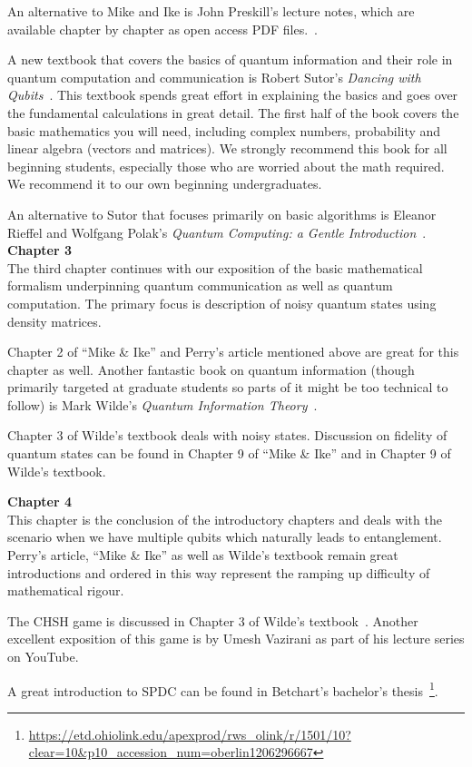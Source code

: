An alternative to Mike and Ike is John Preskill's lecture notes, which are available chapter by chapter as open access PDF files.~\cite{preskill1998lecture}.

A new textbook that covers the basics of quantum information and their role in quantum computation and communication is Robert Sutor's \emph{Dancing with Qubits}~\cite{sutor19:dancing}. This textbook spends great effort in explaining the basics and goes over the fundamental calculations in great detail. The first half of the book covers the basic mathematics you will need, including complex numbers, probability and linear algebra (vectors and matrices). We strongly recommend this book for all beginning students, especially those who are worried about the math required. We recommend it to our own beginning undergraduates.

An alternative to Sutor that focuses primarily on basic algorithms is Eleanor Rieffel and Wolfgang Polak's \emph{Quantum Computing: a Gentle Introduction}~\cite{rieffel2011quantum}.\\

\textbf{Chapter 3}\\

The third chapter continues with our exposition of the basic mathematical formalism underpinning quantum communication as well as quantum computation. The primary focus is description of noisy quantum states using density matrices.

Chapter 2 of “Mike \& Ike” and Perry’s article mentioned above are great for this chapter as well. Another fantastic book on quantum information (though primarily targeted at graduate students so parts of it might be too technical to follow) is Mark Wilde's \emph{Quantum Information Theory}~\cite{wilde2013quantum}.

Chapter 3 of Wilde’s textbook deals with noisy states. Discussion on fidelity of quantum states can be found in Chapter 9 of “Mike \& Ike” and in Chapter 9 of Wilde’s textbook.\\

\newpage

\textbf{Chapter 4}\\

This chapter is the conclusion of the introductory chapters and deals with the scenario when we have multiple qubits which naturally leads to entanglement. Perry’s article, “Mike \& Ike” as well as Wilde’s textbook remain great introductions and ordered in this way represent the ramping up difficulty of mathematical rigour. 

The CHSH game is discussed in Chapter 3 of Wilde’s textbook~\cite{wilde2013quantum}. Another excellent exposition of this game is by Umesh Vazirani as part of his lecture series on YouTube.

A great introduction to SPDC can be found in Betchart’s bachelor's thesis~\footnote{\url{https://etd.ohiolink.edu/apexprod/rws_olink/r/1501/10?clear=10&p10_accession_num=oberlin1206296667}}.

